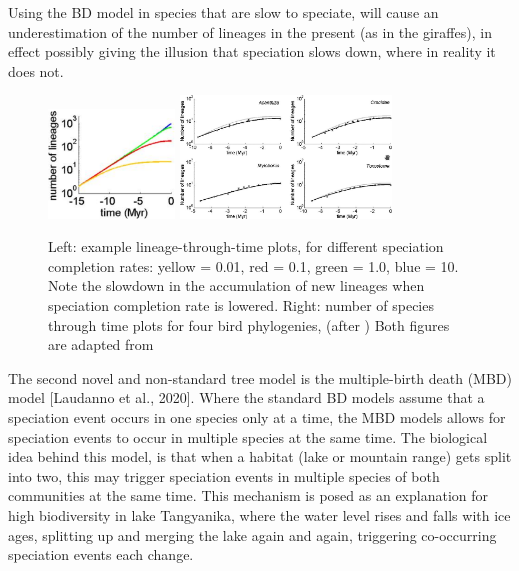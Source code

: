 Using the BD model in species that are slow to speciate, will cause
an underestimation of the number of lineages in the present (as in the
giraffes), in effect possibly giving the illusion that speciation 
slows down, where in reality it does not. 

\begin{figure}[H]

  \includegraphics[width=0.3\textwidth]{eteinne_rosindell_2011_ltt.png}
  \includegraphics[width=0.5\textwidth]{eteinne_rosindell_2011.png}
  \caption{
    Left: example lineage-through-time plots, for different 
    speciation completion rates: yellow = 0.01, red = 0.1, green = 1.0, blue = 10.
    Note the slowdown in the accumulation of new lineages when speciation completion
    rate is lowered.
    Right: number of species through time plots for four bird phylogenies, 
    (after \cite{phillimore2008density})
    Both figures are adapted from \cite{etienne2012prolonging}
 }
  \label{fig:etienne2012prolonging}
\end{figure}

The second novel and non-standard tree model is the multiple-birth 
death (MBD) model [Laudanno et al., 2020].
Where the standard BD models assume that a speciation event occurs in one
species only at a time, the MBD models allows for speciation events
to occur in multiple species at the same time.
The biological idea behind this model, is that when a 
habitat (lake or mountain range) gets split into two, 
this may trigger speciation events in multiple species
of both communities at the same time. 
This mechanism is posed as an
explanation for high biodiversity in lake Tangyanika,
where the water level rises and falls with ice ages,
splitting up and merging the lake again and again, 
triggering co-occurring speciation events each change. 

